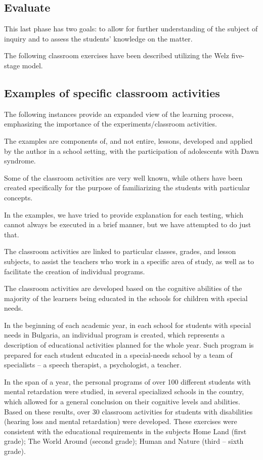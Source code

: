 \documentclass[11.5pt]{sig-alternate} %
\begin{document}
\begin{large}
\subsection*{Evaluate}

This last phase has two goals: to allow for further understanding of the subject of inquiry and to assess the students’ knowledge on the matter.

The following classroom exercises have been described utilizing the Welz five-stage model.

\subsection*{Examples of specific classroom activities}

The following instances provide an expanded view of the learning process, emphasizing the importance of the experiments/classroom activities.

The examples are components of, and not entire, lessons, developed and applied by the author in a school setting, with the participation of adolescents with Dawn syndrome.

Some of the classroom activities  are very well known, while others have been created specifically for the purpose of familiarizing the students with particular concepts.

In the examples, we have tried to provide explanation for each testing, which cannot always be executed in a brief manner, but we have attempted to do just that.

The classroom activities are linked to particular classes, grades, and lesson subjects, to assist the teachers who work in a specific area of study, as well as to facilitate the creation of individual programs.

The classroom activities are developed based on the cognitive abilities of the majority of the learners being educated in the schools for children with special needs.

In the beginning of each academic year, in each school for students with special needs in Bulgaria, an individual program is created, which represents a description of educational activities planned for the whole year. Such program is prepared for each student educated in a special-needs school by a team of specialists – a speech therapist, a psychologist, a teacher.

In the span of a year, the personal programs of over 100 different students with mental retardation were studied, in several specialized schools  in the country, which allowed for a general conclusion on their cognitive levels and abilities. Based on these results, over 30 classroom activities for students with disabilities (hearing loss and mental retardation) were developed. These exercises were consistent with the educational requirements in the subjects Home Land (first grade); The World Around (second grade); Human and Nature (third – sixth grade).


\end{large}
\end{document}

